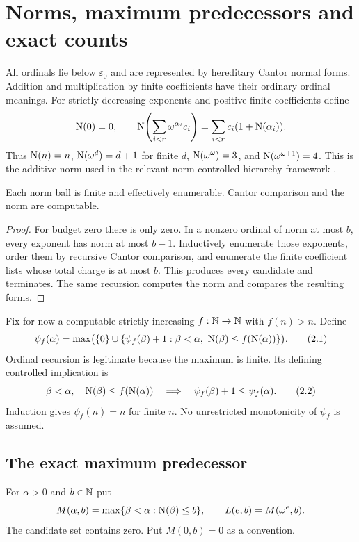 \section{Norms, maximum predecessors and exact counts}
\label{sec:descent}

All ordinals lie below $\varepsilon_0$ and are represented by hereditary
Cantor normal forms. Addition and multiplication by finite coefficients
have their ordinary ordinal meanings. For strictly decreasing exponents
and positive finite coefficients define
\[
 \operatorname{N}(0)=0,\qquad
 \operatorname{N}\!\left(\sum_{i<r}\omega^{\alpha_i}c_i\right)
       =\sum_{i<r}c_i(1+\operatorname{N}(\alpha_i)).
\]
Thus $\operatorname{N}(n)=n$, $\operatorname{N}(\omega^d)=d+1$ for finite $d$,
$\operatorname{N}(\omega^\omega)=3$, and
$\operatorname{N}(\omega^{\omega+1})=4$. This is the additive norm used
in the relevant norm-controlled hierarchy framework
\cite{bcw,ww}.

\begin{lemma}\label{lem:norm-balls}
Each norm ball is finite and effectively enumerable.
Cantor comparison and the norm are computable.
\end{lemma}
\begin{proof}
For budget zero there is only zero. In a nonzero ordinal of norm at
most $b$, every exponent has norm at most $b-1$. Inductively enumerate
those exponents, order them by recursive Cantor comparison, and enumerate
the finite coefficient lists whose total charge is at most $b$.
This produces every candidate and terminates. The same recursion
computes the norm and compares the resulting forms.
\end{proof}

Fix for now a computable strictly increasing $f:\mathbb N\to\mathbb N$ with
$f(n)>n$. Define
\[
 \psi_f(\alpha)=\max\bigl(\{0\}\cup
   \{\psi_f(\beta)+1:\beta<\alpha,\ 
                    \norm(\beta)\le f(\norm(\alpha))\}\bigr).
 \tag{2.1}
\]
Ordinal recursion is legitimate because the maximum is finite.
Its defining controlled implication is
\[
 \beta<\alpha,\quad \operatorname{N}(\beta)\le f(\operatorname{N}(\alpha))
 \quad\Longrightarrow\quad
 \psi_f(\beta)+1\le\psi_f(\alpha).
 \tag{2.2}
\]
Induction gives $\psi_f(n)=n$ for finite $n$.
No unrestricted monotonicity of $\psi_f$ is assumed.

\subsection{The exact maximum predecessor}
For $\alpha>0$ and $b\in\mathbb N$ put
\[
 M(\alpha,b)=\max\{\beta<\alpha:\operatorname{N}(\beta)\le b\},
 \qquad L(e,b)=M(\omega^e,b).
\]
The candidate set contains zero. Put $M(0,b)=0$ as a convention.

